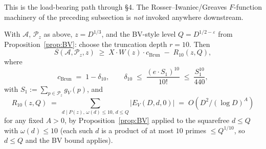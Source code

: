 This is the load-bearing path through \S4. The Rosser--Iwaniec/Greaves
$F$-function machinery of the preceding subsection is \emph{not}
invoked anywhere downstream.

\begin{proposition}[Brun pure sieve at $\kappa_{V} = 0$, lower bound]
\label{prop:brun-pure}
With $\mathcal{A}$, $\mathcal{P}_{z}$ as above, $z = D^{1/3}$, and
the BV-style level $Q = D^{1/2 - \varepsilon}$ from
Proposition~\ref{prop:BV}: choose the truncation depth $r = 10$. Then
\begin{equation}\label{eq:brun-pure-lower}
  S(\mathcal{A}, \mathcal{P}_{z}, z)
    \;\geq\; X \cdot W(z) \cdot c_{\mathrm{Brun}}
       \;-\; R_{10}(z, Q),
\end{equation}
where
\begin{equation}\label{eq:cBrun-defn}
  c_{\mathrm{Brun}} \;=\; 1 - \delta_{10},
  \qquad
  \delta_{10} \;\leq\; \frac{(e \cdot S_{1})^{10}}{10!}
  \;\leq\; \frac{S_{1}^{10}}{440},
\end{equation}
with $S_{1} := \sum_{p \in \mathcal{P}_{z}} g_{V}(p)$, and
\begin{equation}\label{eq:R10-bound}
  R_{10}(z, Q) \;=\; \sum_{d \mid P(z), \, \omega(d) \leq 10, \,
    d \leq Q} |E_{V}(D, d, 0)| \;=\; O(D^{2} / (\log D)^{A})
\end{equation}
for any fixed $A > 0$, by Proposition~\ref{prop:BV} applied to
the squarefree $d \leq Q$ with $\omega(d) \leq 10$ (each such $d$ is a
product of at most $10$ primes $\leq Q^{1/10}$, so $d \leq Q$ and the
BV bound applies).
\end{proposition}

